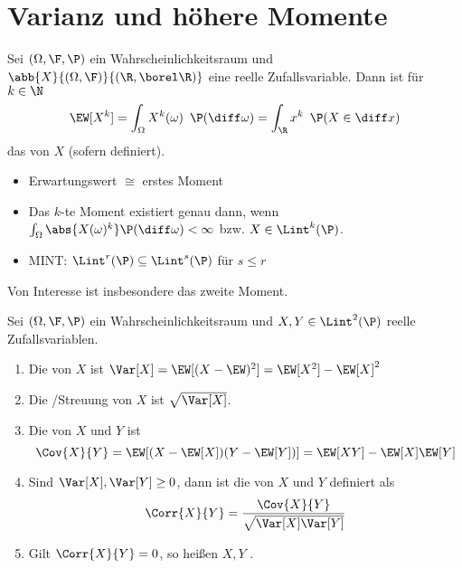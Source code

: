 \section{Varianz und höhere Momente}

\begin{definition}[$k$-te Momente]
	\label{5_10_definition}
	Sei $(\Omega,\F,\P)$ ein Wahrscheinlichkeitsraum und $\abb{X}{(\Omega,\F)}{(\R, \borel\R)}$ eine reelle Zufallsvariable. Dann ist für $k \in \N$
	\begin{equation*}
		\EW[X^k] = \int_{\Omega} X^k(\omega) \enskip \P(\diff \omega) = \int_{\R} x^k \enskip \P(X \in \diff x)
	\end{equation*}
	das  von $X$ (sofern definiert).
\end{definition}
\begin{*bemerkung}
	\begin{itemize}[nolistsep,leftmargin=*]
		\item Erwartungswert $\cong$ erstes Moment
		\item Das $k$-te Moment existiert genau dann, wenn $\int_{\Omega} \abs{X(\omega)^k}\P(\diff \omega) < \infty$ bzw. $X \in \Lint^{k}(\P)$.
		\item MINT: $\Lint^{r}(\P) \subseteq \Lint^{s}(\P)$ für $s \le r$
	\end{itemize}
\end{*bemerkung}

Von Interesse ist insbesondere das zweite Moment.
\begin{definition}
	\label{5_11_definition}
	Sei $(\Omega,\F,\P)$ ein Wahrscheinlichkeitsraum und $X,Y \in \Lint^{2}(\P)$ reelle Zufallsvariablen.
	\begin{enumerate}[leftmargin=*,nolistsep]
		\item Die  von $X$ ist $\Var[X] = \EW[(X - \EW)^2] = \EW[X^2] - \EW[X]^2$
		\item Die /Streuung von $X$ ist $\sqrt{\Var[X]}$.
		\item Die  von $X$ und $Y$ ist
		\begin{equation*}
			\Cov{X}{Y} = \EW[(X-{\EW[X]})(Y-{\EW[Y]})] = \EW[XY] - \EW[X]\EW[Y]
		\end{equation*}
		\item Sind $\Var[X], \Var[Y] \ge 0$, dann ist die  von $X$ und $Y$ definiert als
		\begin{equation*}
			\Corr{X}{Y} = \frac{\Cov{X}{Y}}{\sqrt{\Var[X]\Var[Y]}}
		\end{equation*} 
		\item Gilt $\Corr{X}{Y} = 0$, so heißen $X,Y$ .
	\end{enumerate}
\end{definition}

